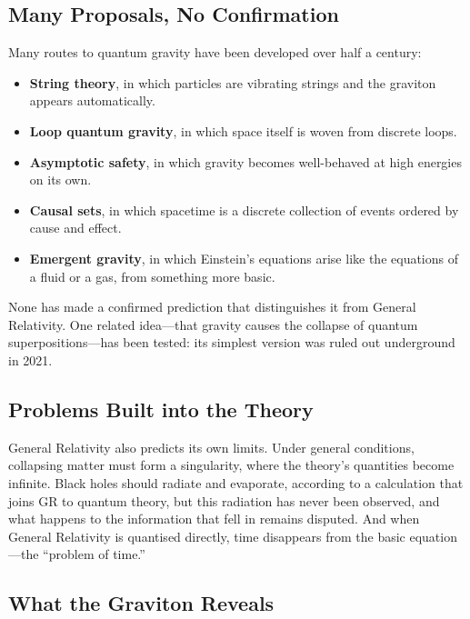 \documentclass[11pt,a4paper]{article}
\begin{document}
\subsection{Many Proposals, No Confirmation}

Many routes to quantum gravity have been developed over half a century:

\begin{itemize}
  \item \textbf{String theory}, in which particles are vibrating strings and the graviton appears automatically.
  \item \textbf{Loop quantum gravity}, in which space itself is woven from discrete loops.
  \item \textbf{Asymptotic safety}, in which gravity becomes well-behaved at high energies on its own.
  \item \textbf{Causal sets}, in which spacetime is a discrete collection of events ordered by cause and effect.
  \item \textbf{Emergent gravity}, in which Einstein's equations arise like the equations of a fluid or a gas, from something more basic.
\end{itemize}

None has made a confirmed prediction that distinguishes it from General Relativity. One related idea---that gravity causes the collapse of quantum superpositions---has been tested: its simplest version was ruled out underground in 2021.

\subsection{Problems Built into the Theory}

General Relativity also predicts its own limits. Under general conditions, collapsing matter must form a singularity, where the theory's quantities become infinite. Black holes should radiate and evaporate, according to a calculation that joins GR to quantum theory, but this radiation has never been observed, and what happens to the information that fell in remains disputed. And when General Relativity is quantised directly, time disappears from the basic equation---the ``problem of time.''

\subsection{What the Graviton Reveals}
\end{document}

